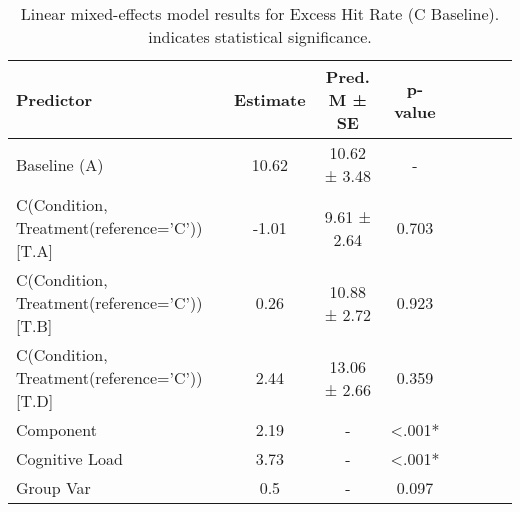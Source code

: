 
    \begin{table}[H]
    \centering
    \begin{small}
    \begin{tabular}{lccccccc}
\toprule
Predictor & Estimate & Pred. M ± SE & p-value \\
\midrule
Baseline (A) & 10.62 & 10.62 ± 3.48 & - \\
C(Condition, Treatment(reference='C'))[T.A] & -1.01 & 9.61 ± 2.64 & 0.703 \\
C(Condition, Treatment(reference='C'))[T.B] & 0.26 & 10.88 ± 2.72 & 0.923 \\
C(Condition, Treatment(reference='C'))[T.D] & 2.44 & 13.06 ± 2.66 & 0.359 \\
Component & 2.19 & - & <.001* \\
Cognitive Load & 3.73 & - & <.001* \\
Group Var & 0.5 & - & 0.097 \\
\bottomrule
\end{tabular}

    \end{small}
    \caption[Linear mixed-effects model results for Excess Hit Rate (C Baseline)]{Linear mixed-effects model results for Excess Hit Rate (C Baseline). \newline * indicates statistical significance.}
    \label{tab:excesshitrate (c baseline)}

    \end{table}